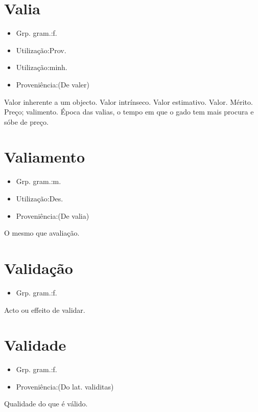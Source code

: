 \documentclass{article}
\begin{document}
\section{Valia}
\begin{itemize}
\item {Grp. gram.:f.}
\end{itemize}
\begin{itemize}
\item {Utilização:Prov.}
\end{itemize}
\begin{itemize}
\item {Utilização:minh.}
\end{itemize}
\begin{itemize}
\item {Proveniência:(De \textunderscore valer\textunderscore )}
\end{itemize}
Valor inherente a um objecto.
Valor intrínseco.
Valor estimativo.
Valor.
Mérito.
Preço; valimento.
\textunderscore Época das valias\textunderscore , o tempo em que o gado tem mais procura e sóbe de preço.
\section{Valiamento}
\begin{itemize}
\item {Grp. gram.:m.}
\end{itemize}
\begin{itemize}
\item {Utilização:Des.}
\end{itemize}
\begin{itemize}
\item {Proveniência:(De \textunderscore valia\textunderscore )}
\end{itemize}
O mesmo que \textunderscore avaliação\textunderscore .
\section{Validação}
\begin{itemize}
\item {Grp. gram.:f.}
\end{itemize}
Acto ou effeito de validar.
\section{Validade}
\begin{itemize}
\item {Grp. gram.:f.}
\end{itemize}
\begin{itemize}
\item {Proveniência:(Do lat. \textunderscore validitas\textunderscore )}
\end{itemize}
Qualidade do que é válido.
\end{document}
